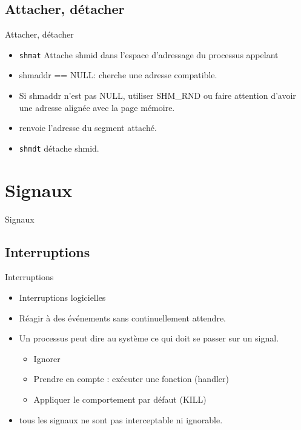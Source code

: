 \begin{frame}{\sectitle}
\def\subsectitle{Attacher, détacher}
\subsection{\subsectitle}
\begin{block}{\subsectitle}
\begin{itemize}
    \item \texttt{shmat} Attache shmid dans l'espace d'adressage du processus appelant
    \item shmaddr == NULL: cherche une adresse compatible.
    \item Si shmaddr n'est pas NULL, utiliser SHM\_RND ou faire attention
    d'avoir une adresse alignée avec la page mémoire.
    \item renvoie l'adresse du segment attaché.
    \item \texttt{shmdt} détache shmid.
\end{itemize}
\end{block}
\end{frame}

\def\sectitle{Signaux}
\section{\sectitle}
\begin{frame}{\sectitle}
\def\subsectitle{Interruptions}
\subsection{\subsectitle}
\begin{block}{\subsectitle}
\begin{itemize}
    \item Interruptions logicielles
    \item Réagir à des événements sans continuellement attendre.
    \item Un processus peut dire au système ce qui doit se passer sur un signal.
    \begin{itemize}
        \item Ignorer
        \item Prendre en compte : exécuter une fonction (handler)
        \item Appliquer le comportement par défaut (KILL)
    \end{itemize}
    \item tous les signaux ne sont pas interceptable ni ignorable.
\end{itemize}
\end{block}
\end{frame}


